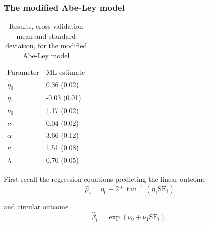 \documentclass[12pt,]{article}
\begin{document}
\subsubsection{The modified Abe-Ley model} \label{resAL}

\begin{table}

\caption{\label{tab:estAL}Results, cross-validation mean and standard deviation, for the modified Abe-Ley model}
\centering
\begin{tabular}[t]{ll}
\toprule
\multicolumn{1}{c}{Parameter} & \multicolumn{1}{c}{ML-estimate} \\
\cmidrule(l{2pt}r{2pt}){1-1} \cmidrule(l{2pt}r{2pt}){2-2}
$\eta_0$ & 0.36 (0.02)\\
$\eta_1$ & -0.03 (0.01)\\
$\nu_0$ & 1.17 (0.02)\\
$\nu_1$ & 0.04 (0.02)\\
$\alpha$ & 3.66 (0.12)\\
$\kappa$ & 1.51 (0.08)\\
$\lambda$ & 0.70 (0.05)\\
\bottomrule
\end{tabular}
\end{table}

First recall the regression equations predicting the linear outcome
\[\hat{\mu}_{i} = \eta_0 + 2 * \tan^{-1}(\eta_1\text{SE}_i)\]

\noindent and circular outcome
\[\hat{\beta}_{i} = \exp(\nu_0 + \nu_1\text{SE}_i).\]
\end{document}
